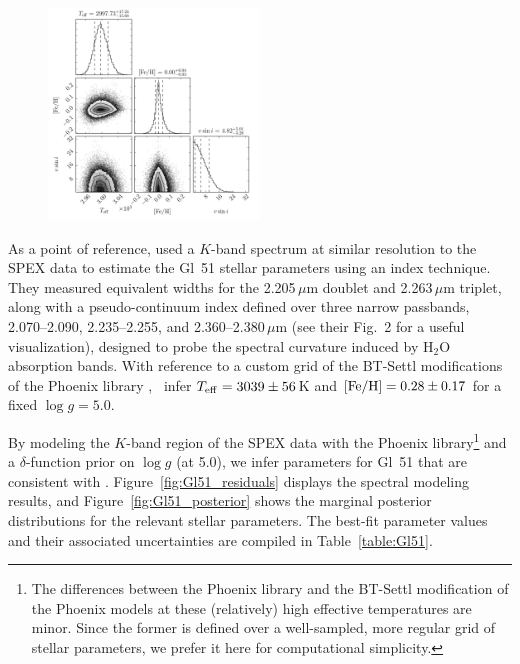 \documentclass[iop,floatfix]{emulateapj}
\begin{document}
\begin{figure}[!b]
  \includegraphics[width=0.5\textwidth]{figs/Gl51_triangle.pdf}
\end{figure}

As a point of reference, \citet{rojas-ayala12} used a $K$-band spectrum at similar resolution to 
the SPEX data to estimate the Gl~51 stellar parameters using an index technique.  They measured 
equivalent widths for the 2.205\,$\mu$m  doublet and 2.263\,$\mu$m  triplet, 
along with a pseudo-continuum index defined over three narrow passbands, 2.070--2.090, 
2.235--2.255, and 2.360--2.380\,$\mu$m (see their Fig.~2 for a useful visualization), designed to 
probe the spectral curvature induced by H$_2$O absorption bands.  With reference to a custom grid 
of the {\sc BT-Settl} modifications of the {\sc Phoenix} library \citep{allard12}, 
\citeauthor{rojas-ayala12}~infer $T_{\rm eff} = 3039\pm56$\,K and $[{\rm Fe/H}] = 0.28\pm0.17$ for 
a fixed $\log g = 5.0$.  

By modeling the $K$-band region of the SPEX data with the {\sc Phoenix} library\footnote{The 
differences between the \citet{husser13} {\sc Phoenix} library and the {\sc BT-Settl} modification 
of the {\sc Phoenix} models at these (relatively) high effective temperatures are minor.  Since the 
former is defined over a well-sampled, more regular grid of stellar parameters, we prefer it here 
for computational simplicity.} and a $\delta$-function prior on $\log g$ (at 5.0), we infer 
parameters for Gl~51 that are consistent with \citet{rojas-ayala12}.  
Figure~\ref{fig:Gl51_residuals} displays the spectral modeling results, and 
Figure~\ref{fig:Gl51_posterior} shows the marginal posterior distributions for the relevant stellar 
parameters.  The best-fit parameter values and their associated uncertainties are compiled in 
Table~\ref{table:Gl51}.
\end{document}

